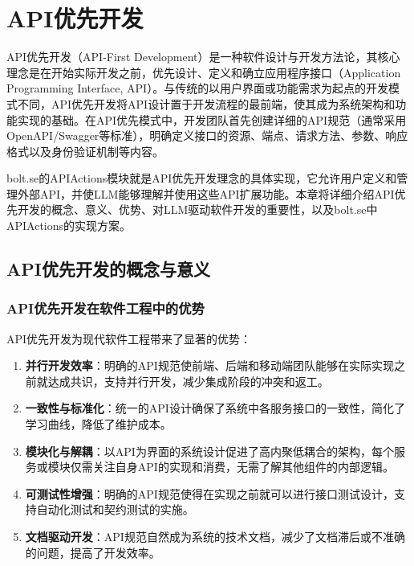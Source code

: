 
\chapter{API优先开发}

API优先开发（API-First Development）是一种软件设计与开发方法论，其核心理念是在开始实际开发之前，优先设计、定义和确立应用程序接口（Application Programming Interface, API）。与传统的以用户界面或功能需求为起点的开发模式不同，API优先开发将API设计置于开发流程的最前端，使其成为系统架构和功能实现的基础。在API优先模式中，开发团队首先创建详细的API规范（通常采用OpenAPI/Swagger等标准），明确定义接口的资源、端点、请求方法、参数、响应格式以及身份验证机制等内容。

bolt.se的APIActions模块就是API优先开发理念的具体实现，它允许用户定义和管理外部API，并使LLM能够理解并使用这些API扩展功能。本章将详细介绍API优先开发的概念、意义、优势、对LLM驱动软件开发的重要性，以及bolt.se中APIActions的实现方案。

\section{API优先开发的概念与意义}

\subsection{API优先开发在软件工程中的优势}
API优先开发为现代软件工程带来了显著的优势：

\begin{enumerate}
  \item \textbf{并行开发效率}：明确的API规范使前端、后端和移动端团队能够在实际实现之前就达成共识，支持并行开发，减少集成阶段的冲突和返工。
  
  \item \textbf{一致性与标准化}：统一的API设计确保了系统中各服务接口的一致性，简化了学习曲线，降低了维护成本。
  
  \item \textbf{模块化与解耦}：以API为界面的系统设计促进了高内聚低耦合的架构，每个服务或模块仅需关注自身API的实现和消费，无需了解其他组件的内部逻辑。
  
  \item \textbf{可测试性增强}：明确的API规范使得在实现之前就可以进行接口测试设计，支持自动化测试和契约测试的实施。
  
  \item \textbf{文档驱动开发}：API规范自然成为系统的技术文档，减少了文档滞后或不准确的问题，提高了开发效率。
\end{enumerate}


